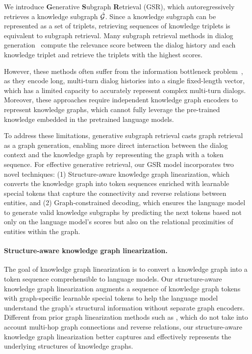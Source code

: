 
\label{sec:3.2}
We introduce \textbf{G}enerative \textbf{S}ubgraph \textbf{R}etrieval (GSR), which autoregressively retrieves a knowledge subgraph $\hat{\mathcal{G}}$.
Since a knowledge subgraph can be represented as a set of triplets, retrieving sequences of knowledge triplets is equivalent to subgraph retrieval.
Many subgraph retrieval methods in dialog generation~\cite{zhang2022subgraph,kang2022knowledge} compute the relevance score between the dialog history and each knowledge triplet and retrieve the triplets with the highest scores.

However, these methods often suffer from the information bottleneck problem~\cite{izacard2020memory, luan2021sparse}, as they encode long, multi-turn dialog histories into a single fixed-length vector, which has a limited capacity to accurately represent complex multi-turn dialogs.
Moreover, these approaches require independent knowledge graph encoders to represent knowledge graphs, which cannot fully leverage the pre-trained knowledge embedded in the pretrained language models.

To address these limitations, generative subgraph retrieval casts graph retrieval as a graph generation, enabling more direct interaction between the dialog context and the knowledge graph by representing the graph with a token sequence.
For effective generative retrieval, our GSR model incorporates two novel techniques: (1) Structure-aware knowledge graph linearization, which converts the knowledge graph into token sequences enriched with learnable special tokens that capture the connectivity and reverse relations between entities, and (2) Graph-constrained decoding, which ensures the language model to generate valid knowledge subgraphs by predicting the next tokens based not only on the language model's scores but also on the relational proximities of entities within the graph.


\paragraph{Structure-aware knowledge graph linearization.}
The goal of knowledge graph linearization is to convert a knowledge graph into a token sequence comprehensible to language models.
Our structure-aware knowledge graph linearization augments a sequence of knowledge graph tokens with graph-specific learnable special tokens to help the language model understand the graph's structural information without separate graph encoders.
Different from prior graph linearization methods such as \citet{xu-etal-2023-unsupervised}, which do not take into account multi-hop graph connections and reverse relations, our structure-aware knowledge graph linearization better captures and effectively represents the underlying structures of knowledge graphs.


